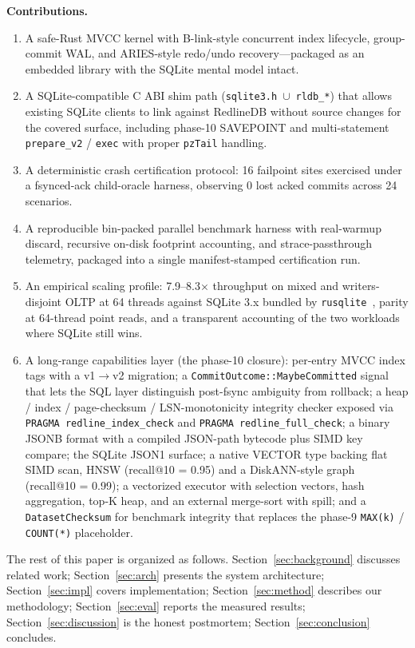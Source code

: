 \textbf{Contributions.}
\begin{enumerate}
\item A safe-Rust MVCC kernel with B-link-style concurrent index
lifecycle, group-commit WAL, and ARIES-style redo/undo
recovery---packaged as an embedded library with the SQLite mental model
intact.
\item A SQLite-compatible C ABI shim path
(\texttt{sqlite3.h}~$\cup$~\texttt{rldb\_*}) that allows existing
SQLite clients to link against RedlineDB without source changes for the
covered surface, including phase-10 SAVEPOINT and multi-statement
\texttt{prepare\_v2} / \texttt{exec} with proper \texttt{pzTail}
handling.
\item A deterministic crash certification protocol: 16 failpoint sites
exercised under a fsynced-ack child-oracle harness, observing 0 lost
acked commits across 24 scenarios.
\item A reproducible bin-packed parallel benchmark harness with
real-warmup discard, recursive on-disk footprint accounting, and
strace-passthrough telemetry, packaged into a single
manifest-stamped certification run.
\item An empirical scaling profile: 7.9--8.3$\times$ throughput on
mixed and writers-disjoint OLTP at 64 threads against SQLite 3.x
bundled by \texttt{rusqlite}~\cite{rusqlite}, parity at 64-thread point
reads, and a transparent accounting of the two workloads where SQLite
still wins.
\item A long-range capabilities layer (the phase-10 closure):
per-entry MVCC index tags with a v1$\rightarrow$v2 migration; a
\texttt{CommitOutcome::MaybeCommitted} signal that lets the SQL
layer distinguish post-fsync ambiguity from rollback; a heap /
index / page-checksum / LSN-monotonicity integrity checker exposed
via \texttt{PRAGMA redline\_index\_check} and
\texttt{PRAGMA redline\_full\_check}; a binary JSONB format with a
compiled JSON-path bytecode plus SIMD key compare; the SQLite
JSON1 surface; a native VECTOR type backing flat SIMD scan, HNSW
(recall@10 = 0.95) and a DiskANN-style graph (recall@10 = 0.99);
a vectorized executor with selection vectors, hash aggregation,
top-K heap, and an external merge-sort with spill; and a
\texttt{DatasetChecksum} for benchmark integrity that replaces the
phase-9 \texttt{MAX(k)} / \texttt{COUNT(*)} placeholder.
\end{enumerate}

The rest of this paper is organized as follows. Section~\ref{sec:background}
discusses related work; Section~\ref{sec:arch} presents the system
architecture; Section~\ref{sec:impl} covers implementation;
Section~\ref{sec:method} describes our methodology;
Section~\ref{sec:eval} reports the measured results;
Section~\ref{sec:discussion} is the honest postmortem;
Section~\ref{sec:conclusion} concludes.
